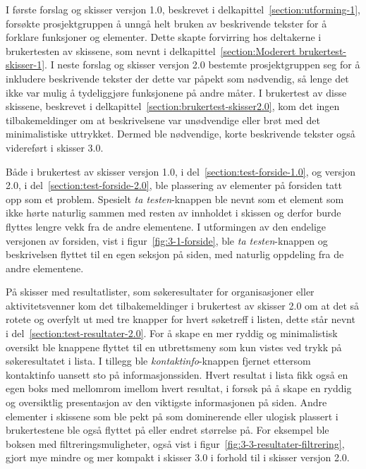 I første forslag og skisser versjon 1.0, beskrevet i delkapittel~\ref{section:utforming-1}, forsøkte prosjektgruppen å unngå helt bruken av beskrivende tekster for å forklare funksjoner og elementer. Dette skapte forvirring hos deltakerne i brukertesten av skissene, som nevnt i delkapittel~\ref{section:Moderert brukertest-skisser-1}. I neste forslag og skisser versjon 2.0 bestemte prosjektgruppen seg for å inkludere beskrivende tekster der dette var påpekt som nødvendig, så lenge det ikke var mulig å tydeliggjøre funksjonene på andre måter. I brukertest av disse skissene, beskrevet i delkapittel~\ref{section:brukertest-skisser2.0}, kom det ingen tilbakemeldinger om at beskrivelsene var unødvendige eller brøt med det minimalistiske uttrykket. Dermed ble nødvendige, korte beskrivende tekster også videreført i skisser 3.0.

Både i brukertest av skisser versjon 1.0, i del~\ref{section:test-forside-1.0}, og versjon 2.0, i del~\ref{section:test-forside-2.0}, ble plassering av elementer på forsiden tatt opp som et problem. Spesielt {\em ta testen}-knappen ble nevnt som et element som ikke hørte naturlig sammen med resten av innholdet i skissen og derfor burde flyttes lengre vekk fra de andre elementene. I utformingen av den endelige versjonen av forsiden, vist i figur~\ref{fig:3-1-forside}, ble {\em ta testen}-knappen og beskrivelsen flyttet til en egen seksjon på siden, med naturlig oppdeling fra de andre elementene.

På skisser med resultatlister, som søkeresultater for organisasjoner eller aktivitetsvenner kom det tilbakemeldinger i brukertest av skisser 2.0 om at det så rotete og overfylt ut med tre knapper for hvert søketreff i listen, dette står nevnt i del~\ref{section:test-resultater-2.0}. For å skape en mer ryddig og minimalistisk oversikt ble knappene flyttet til en utbrettsmeny som kun vistes ved trykk på søkeresultatet i lista. I tillegg ble {\em kontaktinfo}-knappen fjernet ettersom kontaktinfo uansett sto på informasjonssiden. Hvert resultat i lista fikk også en egen boks med mellomrom imellom hvert resultat, i forsøk på å skape en ryddig og oversiktlig presentasjon av den viktigste informasjonen på siden. Andre elementer i skissene som ble pekt på som dominerende eller ulogisk plassert i brukertestene ble også flyttet på eller endret størrelse på. For eksempel ble boksen med filtreringsmuligheter, også vist i figur~\ref{fig:3-3-resultater-filtrering}, gjort mye mindre og mer kompakt i skisser 3.0 i forhold til i skisser versjon 2.0.

